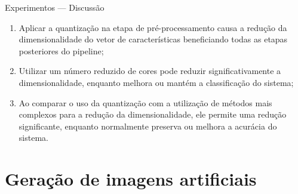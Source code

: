 \documentclass{beamer}
\begin{document}
\begin{frame}{Experimentos --- Discussão}
  \setlength\leftmargini{1em}
  \begin{block}{}
    \justifying
    \begin{enumerate}
      \item Aplicar a quantização na etapa de pré-processamento causa a redução da dimensionalidade do vetor de características beneficiando todas as etapas posteriores do pipeline;
      \item Utilizar um número reduzido de cores pode reduzir significativamente a dimensionalidade, enquanto melhora ou mantém a classificação do sistema;
      \item Ao comparar o uso da quantização com a utilização de métodos mais complexos para a redução da dimensionalidade, ele permite uma redução significante, enquanto normalmente preserva ou melhora a acurácia do sistema.
    \end{enumerate}
  \end{block}
\end{frame}
\section{Geração de imagens artificiais}
\end{document}
